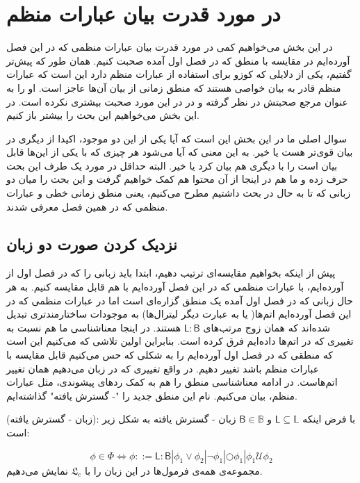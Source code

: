 




\section{در مورد قدرت بیان عبارات منظم}
در این بخش می‌‌خواهیم کمی در مورد قدرت بیان عبارات منظمی که در این فصل آورده‌ایم در مقایسه با منطق  که در فصل اول آمده صحبت کنیم. همان طور که پیش‌تر گفتیم، یکی از دلایلی که کوزو برای استفاده از عبارات منظم دارد این است که عبارات منظم قادر به بیان خواصی هستند که منطق زمانی از بیان آن‌ها عاجز است. او \cite{regisbetter} را به عنوان مرجع صحبتش در نظر گرفته و در \cite{calcul} در این مورد صحبت بیشتری نکرده است. 
در این بخش می‌خواهیم این بحث را بیشتر باز کنیم. 

سوال اصلی ما در این بخش این است که آیا یکی از این دو موجود، اکیدا از دیگری در بیان قوی‌تر هست یا خیر. به این معنی که آیا می‌شود هر چیزی که با یکی از این‌ها قابل بیان است را با دیگری هم بیان کرد یا خیر. البته \cite{regisbetter} حداقل در مورد یک طرف این بحث حرف زده و ما هم در اینجا از آن محتوا هم کمک خواهیم گرفت و این بحث را میان دو زبانی که تا به حال در بحث داشتیم مطرح می‌کنیم، یعنی منطق زمانی خطی و عبارات منظمی که در همین فصل معرفی شدند.

\subsection{نزدیک کردن صورت دو زبان}

پیش از اینکه بخواهیم مقایسه‌ای ترتیب دهیم، ابتدا باید زبانی را که در فصل اول از  آورده‌ایم، با عبارات منظمی که در این فصل آورده‌ایم با هم قابل مقایسه کنیم. به هر حال زبانی که در فصل اول آمده یک منطق گزاره‌ای است اما در عبارات منظمی که در این فصل آورده‌ایم اتم‌ها( یا به عبارت دیگر لیترال‌ها) به موجودات ساختارمندتری تبدیل شده‌اند که همان زوج مرتب‌های $\mathsf{L:B}$ هستند. در اینجا معناشناسی ما هم نسبت به تغییری که در اتم‌ها داده‌ایم فرق کرده است. بنابراین اولین تلاشی که می‌کنیم این است که منطقی که در فصل اول آورده‌ایم را به شکلی که حس می‌کنیم قابل مقایسه با عبارات منظم باشد تغییر دهیم. در واقع تغییری که در زبان می‌دهیم همان تغییر اتم‌هاست. در ادامه معناشناسی منطق  را هم به کمک ردهای پیشوندی، مثل عبارات منظم، بیان می‌کنیم. نام این منطق جدید را "- گسترش یافته" گذاشته‌ایم. 

\begin{defn}
	(زبان - گسترش‌ یافته): با فرض اینکه 
	$\mathsf{L} \subseteq \mathbb{L}$
	و 
	$\mathsf{B} \in \mathbb{B}$
	زبان  - گسترش یافته به شکل زیر است:
	
	$$
	\phi \in \Phi \Leftrightarrow
	\phi ::= \mathsf{L:B} | \phi_1 \lor \phi_2 |
	\neg \phi_1 |
	\bigcirc \phi_1 |
	\phi_1 \mathcal{U}\phi_2 
	$$	
	مجموعه‌ی همه‌ی فرمول‌ها در این زبان را با $\mathfrak{L}_e$ نمایش می‌دهیم.
\end{defn} 

